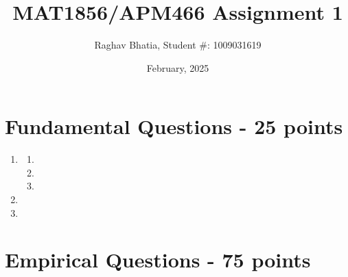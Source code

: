 \documentclass{article}
\title{MAT1856/APM466 Assignment 1}
\author{Raghav Bhatia, Student \#: 1009031619}
\date{February, 2025}
\begin{document}
\maketitle

\section*{Fundamental Questions - 25 points}

\begin{enumerate}
    \item \hfill
    \begin{enumerate}
        \item 
        \item
        \item
    \end{enumerate}
    \item 
    \item
\end{enumerate}



\section*{Empirical Questions - 75 points}
\end{document}
